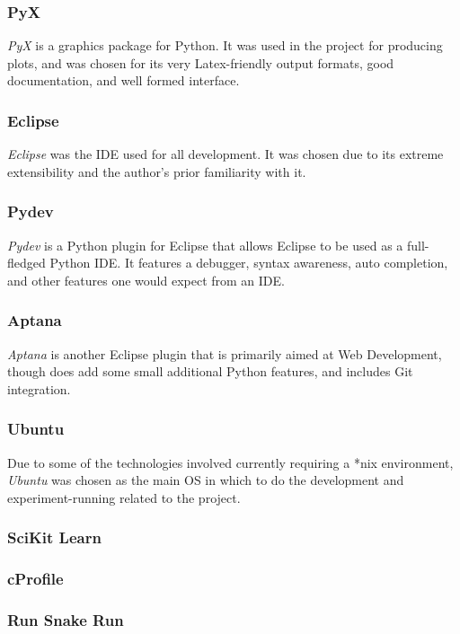 \documentclass[a4paper,11pt]{report}
\begin{document}
\subsubsection*{PyX}
\emph{PyX}\citep{prog:pyx} is a graphics package for Python. It was used in the project for producing plots, and was chosen for its very Latex-friendly output formats, good documentation, and well formed interface.

\subsubsection*{Eclipse}
\emph{Eclipse} was the IDE used for all development. It was chosen due to its extreme extensibility and the author's prior familiarity with it.

\subsubsection*{Pydev}
\emph{Pydev}\citep{prog:pydev} is a Python plugin for Eclipse that allows Eclipse to be used as a full-fledged Python IDE. It features a debugger, syntax awareness, auto completion, and other features one would expect from an IDE.

\subsubsection*{Aptana}
\emph{Aptana} is another Eclipse plugin that is primarily aimed at Web Development, though does add some small additional Python features, and includes Git integration.

\subsubsection*{Ubuntu}
Due to some of the technologies involved currently requiring a *nix environment, \emph{Ubuntu}\citep{prog:ubuntu} was chosen as the main OS in which to do the development and experiment-running related to the project.

\subsubsection*{SciKit Learn}
\subsubsection*{cProfile}
\subsubsection*{Run Snake Run}
\end{document}
